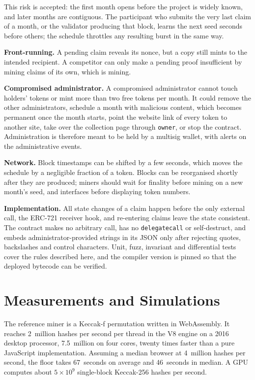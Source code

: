 \documentclass[10pt,letterpaper]{article}
\newcommand{\fn}[1]{\texttt{#1}}
\begin{document}
This risk is accepted: the first month opens before the project is widely known, and later months are contiguous.
The participant who submits the very last claim of a month, or the validator producing that block, learns the next
seed seconds before others; the schedule throttles any resulting burst in the same way.

\textbf{Front-running.} A pending claim reveals its nonce, but a copy still mints to the intended recipient. A
competitor can only make a pending proof insufficient by mining claims of its own, which is mining.

\textbf{Compromised administrator.} A compromised administrator cannot touch holders' tokens or mint more than two
free tokens per month. It could remove the other administrators, schedule a month with malicious content, which
becomes permanent once the month starts, point the website link of every token to another site, take over the
collection page through \fn{owner}, or stop the contract. Administration is therefore meant to be held by a
multisig wallet, with alerts on the administrative events.

\textbf{Network.} Block timestamps can be shifted by a few seconds, which moves the schedule by a negligible
fraction of a token. Blocks can be reorganised shortly after they are produced; miners should wait for finality
before mining on a new month's seed, and interfaces before displaying token numbers.

\textbf{Implementation.} All state changes of a claim happen before the only external call, the ERC-721
receiver hook, and re-entering claims leave the state consistent. The contract makes no arbitrary call, has no
\fn{delegatecall} or self-destruct, and embeds administrator-provided strings in its JSON only after rejecting
quotes, backslashes and control characters. Unit, fuzz, invariant and differential tests cover the rules described
here, and the compiler version is pinned so that the deployed bytecode can be verified.

\section{Measurements and Simulations}

The reference miner is a Keccak-f permutation written in WebAssembly. It reaches 2~million hashes per second per
thread in the V8 engine on a 2016 desktop processor, 7.5~million on four cores, twenty times faster than a pure
JavaScript implementation. Assuming a median browser at 4~million hashes per second, the floor takes 67~seconds on
average and 46~seconds in median. A GPU computes about $5 \times 10^9$ single-block Keccak-256 hashes per second.
\end{document}

